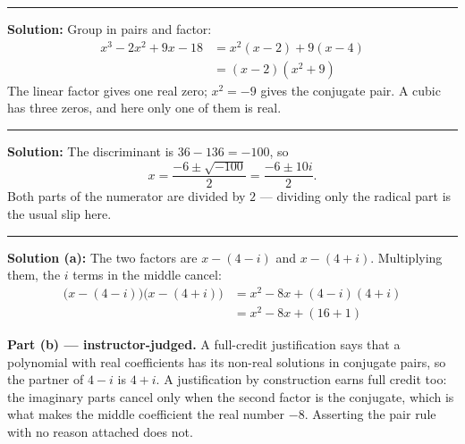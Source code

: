 \documentclass[12pt]{article}
\begin{document}
\vspace{0.15cm}
\noindent\rule{\linewidth}{0.2pt}


\textbf{Solution:} Group in pairs and factor:
\begin{align*}
  x^{3} - 2x^{2} + 9x - 18 &= x^{2}(x - 2) + 9(x - 4) \\
                           &= (x - 2)(x^{2} + 9)
\end{align*}
The linear factor gives one real zero; $x^{2} = -9$ gives the conjugate pair.
A cubic has three zeros, and here only one of them is real. 

\vspace{0.15cm}
\noindent\rule{\linewidth}{0.2pt}


\textbf{Solution:} The discriminant is $36 - 136 = -100$, so
\[
  x = \frac{-6 \pm \sqrt{-100}}{2} = \frac{-6 \pm 10i}{2}.
\]
Both parts of the numerator are divided by $2$ --- dividing only the radical
part is the usual slip here. 

\vspace{0.15cm}
\noindent\rule{\linewidth}{0.2pt}


\textbf{Solution (a):} The two factors are $x - (4 - i)$ and $x - (4 + i)$.
Multiplying them, the $i$ terms in the middle cancel:
\begin{align*}
  \bigl(x - (4 - i)\bigr)\bigl(x - (4 + i)\bigr)
    &= x^{2} - 8x + (4 - i)(4 + i) \\
    &= x^{2} - 8x + (16 + 1)
\end{align*}

\textbf{Part (b) --- instructor-judged.} A full-credit justification says that a
polynomial with real coefficients has its non-real solutions in conjugate pairs,
so the partner of $4 - i$ is $4 + i$. A justification by construction earns full
credit too: the imaginary parts cancel only when the second factor is the
conjugate, which is what makes the middle coefficient the real number $-8$.
Asserting the pair rule with no reason attached does not.
\end{document}
